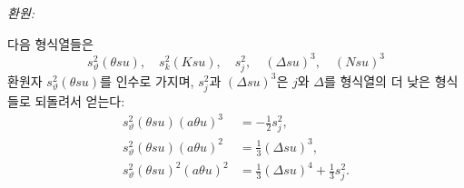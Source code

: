 
\noindent\emph{환원:}

다음 형식열들은
\[
 s_\vartheta^2(\theta su),\quad s_k^2(Ksu),\quad s_j^2,\quad (\Delta su)^3,\quad (Nsu)^3
\]
환원자 $s_\vartheta^2(\theta su)$를 인수로 가지며, $s_j^2$과 $(\Delta su)^3$은 $j$와 $\Delta$를 형식열의 더 낮은 형식들로 되돌려서 얻는다:
\[
\begin{aligned}
s_\vartheta^2(\theta su)(a\theta u)^3&=-\frac12s_j^2,\\
s_\vartheta^2(\theta su)(a\theta u)^2&=\frac13(\Delta su)^3,\\
s_\vartheta^2(\theta su)^2(a\theta u)^2&=\frac13(\Delta su)^4+\frac13s_j^2.
\end{aligned}
\]
